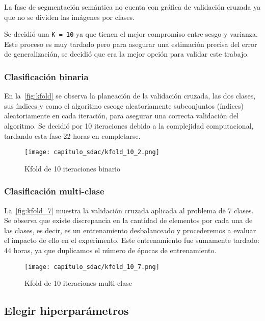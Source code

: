 La fase de segmentación semántica no cuenta con gráfica de validación cruzada ya
que no se dividen las imágenes por clases.

Se decidió una \texttt{K = 10} ya que tienen el mejor compromiso
entre sesgo y varianza. Este proceso es muy tardado pero para asegurar una
estimación precisa del error de generalización, se decidió que era la mejor
opción para validar este trabajo.

\subsubsection{Clasificación binaria}

En la~\autoref{fig:kfold} se observa la planeación de la validación cruzada,
las dos clases, sus índices y como el algoritmo escoge aleatoriamente
subconjuntos (índices) aleatoriamente en cada iteración, para asegurar una
correcta validación del algoritmo. Se decidió por 10 iteraciones debido a la
complejidad computacional, tardando esta fase 22 horas en completarse.

\begin{figure}[H]
    \centering
    \texttt{[image: capitulo\_sdac/kfold\_10\_2.png]}
    \caption{Kfold de 10 iteraciones binario}\label{fig:kfold}
\end{figure}

\subsubsection{Clasificación multi-clase}

La~\autoref{fig:kfold_7} muestra la validación cruzada aplicada al problema de 7
clases. Se observa que existe discrepancia en la cantidad de elementos por cada
una de las clases, es decir, es un entrenamiento desbalanceado y procederemos a
evaluar el impacto de ello en el experimento. Este entrenamiento fue sumamente
tardado: 44 horas, ya que duplicamos el número de épocas de entrenamiento.

\begin{figure}[H]
    \centering
    \texttt{[image: capitulo\_sdac/kfold\_10\_7.png]}
    \caption{Kfold de 10 iteraciones multi-clase}\label{fig:kfold_7}
\end{figure}

\subsection{Elegir hiperparámetros}

